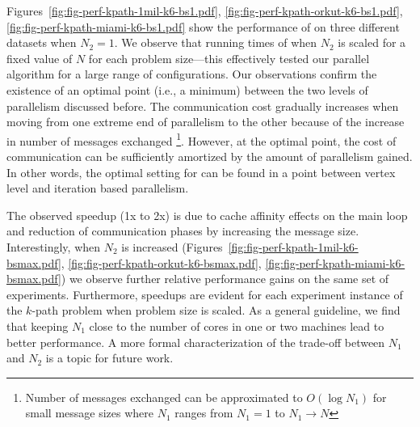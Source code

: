 
Figures~\ref{fig:fig-perf-kpath-1mil-k6-bs1.pdf}, \ref{fig:fig-perf-kpath-orkut-k6-bs1.pdf}, \ref{fig:fig-perf-kpath-miami-k6-bs1.pdf} show the performance of \ouralgo{} on three different datasets when $N_2=1$. We observe that running times of \ouralgo{} when $N_2$ is scaled for a fixed value of $N$ for each problem size---this effectively tested our parallel algorithm for a large range of configurations. Our observations confirm the existence of an optimal point (i.e., a minimum) between the two levels of parallelism discussed before. The communication cost gradually increases when moving from one extreme end of parallelism to the other because of the increase in number of messages exchanged \footnote{Number of messages exchanged can be approximated to $O(\log{N_1})$ for small message sizes where $N_1$ ranges from $N_1=1$ to $N_1\rightarrow N$}. However, at the optimal point, the cost of communication can be sufficiently amortized by the amount of parallelism gained. In other words, the optimal setting for \ouralgo{} can be found in a point between vertex level and iteration based parallelism. 

The observed speedup (1x to 2x) is due to cache affinity effects on the main loop and reduction of communication phases by increasing the message size.
Interestingly, when $N_2$ is increased (Figures~\ref{fig:fig-perf-kpath-1mil-k6-bsmax.pdf}, \ref{fig:fig-perf-kpath-orkut-k6-bsmax.pdf}, \ref{fig:fig-perf-kpath-miami-k6-bsmax.pdf}) we observe further relative performance gains on the same set of experiments. Furthermore, speedups are evident for each experiment instance of the $k$-path problem when problem size is scaled. As a general guideline, we find that keeping $N_1$ close to the number of cores in one or two machines lead to better performance. A more formal characterization of the trade-off between $N_1$ and $N_2$ is a topic for future work.


